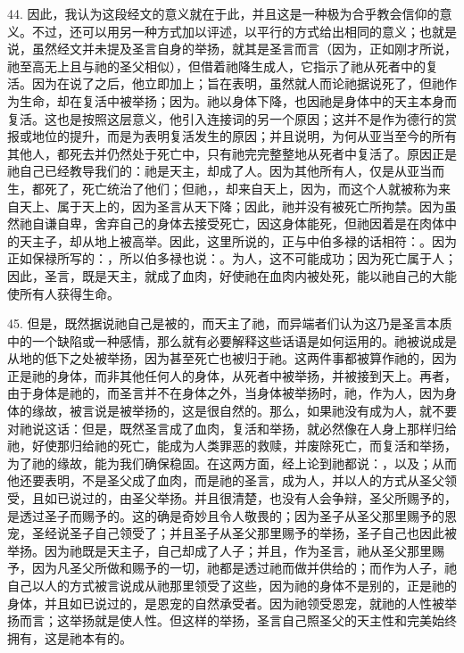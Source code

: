 44. 因此，我认为这段经文的意义就在于此，并且这是一种极为合乎教会信仰的意义。不过，还可以用另一种方式加以评述，以平行的方式给出相同的意义；也就是说，虽然经文并未提及圣言自身的举扬，就其是圣言而言（因为，正如刚才所说，祂至高无上且与祂的圣父相似），但借着祂降生成人，它指示了祂从死者中的复活。因为在说了之后，他立即加上；旨在表明，虽然就人而论祂据说死了，但祂作为生命，却在复活中被举扬；因为。祂以身体下降，也因祂是身体中的天主本身而复活。这也是按照这层意义，他引入连接词的另一个原因；这并不是作为德行的赏报或地位的提升，而是为表明复活发生的原因；并且说明，为何从亚当至今的所有其他人，都死去并仍然处于死亡中，只有祂完完整整地从死者中复活了。原因正是祂自己已经教导我们的：祂是天主，却成了人。因为其他所有人，仅是从亚当而生，都死了，死亡统治了他们；但祂，，却来自天上，因为，而这个人就被称为来自天上、属于天上的，因为圣言从天下降；因此，祂并没有被死亡所拘禁。因为虽然祂自谦自卑，舍弃自己的身体去接受死亡，因这身体能死，但祂因着是在肉体中的天主子，却从地上被高举。因此，这里所说的，正与中伯多禄的话相符：。因为正如保禄所写的：，所以伯多禄也说：。为人，这不可能成功；因为死亡属于人；因此，圣言，既是天主，就成了血肉，好使祂在血肉内被处死，能以祂自己的大能使所有人获得生命。\par

45. 但是，既然据说祂自己是被的，而天主了祂，而异端者们认为这乃是圣言本质中的一个缺陷或一种感情，那么就有必要解释这些话语是如何运用的。祂被说成是从地的低下之处被举扬，因为甚至死亡也被归于祂。这两件事都被算作祂的，因为正是祂的身体，而非其他任何人的身体，从死者中被举扬，并被接到天上。再者，由于身体是祂的，而圣言并不在身体之外，当身体被举扬时，祂，作为人，因为身体的缘故，被言说是被举扬的，这是很自然的。那么，如果祂没有成为人，就不要对祂说这话：但是，既然圣言成了血肉，复活和举扬，就必然像在人身上那样归给祂，好使那归给祂的死亡，能成为人类罪恶的救赎，并废除死亡，而复活和举扬，为了祂的缘故，能为我们确保稳固。在这两方面，经上论到祂都说：，以及；从而他还要表明，不是圣父成了血肉，而是祂的圣言，成为人，并以人的方式从圣父领受，且如已说过的，由圣父举扬。并且很清楚，也没有人会争辩，圣父所赐予的，是透过圣子而赐予的。这的确是奇妙且令人敬畏的；因为圣子从圣父那里赐予的恩宠，圣经说圣子自己领受了；并且圣子从圣父那里赐予的举扬，圣子自己也因此被举扬。因为祂既是天主子，自己却成了人子；并且，作为圣言，祂从圣父那里赐予，因为凡圣父所做和赐予的一切，祂都是透过祂而做并供给的；而作为人子，祂自己以人的方式被言说成从祂那里领受了这些，因为祂的身体不是别的，正是祂的身体，并且如已说过的，是恩宠的自然承受者。因为祂领受恩宠，就祂的人性被举扬而言；这举扬就是使人性。但这样的举扬，圣言自己照圣父的天主性和完美始终拥有，这是祂本有的。\par

